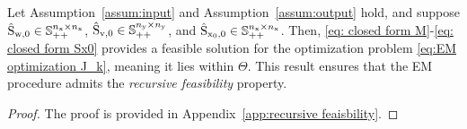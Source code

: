 \begin{proposition}\label{pro: postive definite}
Let Assumption~\ref{assum:input} and Assumption~\ref{assum:output} hold, and suppose $\hat{{ \mathrm{S} }}_{{ \mathrm{w} },0} \in {\mathbb{S}}_{++}^{n_{ \mathrm{x} }\times n_{ \mathrm{x} }} $, $\hat{{ \mathrm{S} }}_{{ \mathrm{v} },0} \in {\mathbb{S}}_{++}^{n_{ \mathrm{y} }\times n_{ \mathrm{y} }}$, and $\hat{{ \mathrm{S} }}_{{ \mathrm{x} }_0,0} \in {\mathbb{S}}_{++}^{n_{ \mathrm{x} }\times n_{ \mathrm{x} }}$. Then, \eqref{eq: closed form M}-\eqref{eq: closed form Sx0} provides a feasible solution for the optimization problem \eqref{eq:EM optimization J_k}, meaning it lies within $\Theta$. This result ensures that the EM procedure admits the \emph{recursive feasibility} property.
\end{proposition}
\begin{proof}
    The proof is provided in Appendix~\ref{app:recursive feaisbility}.
\end{proof}





